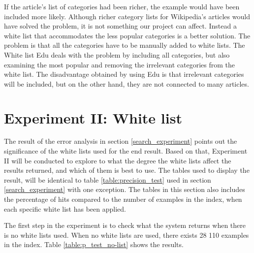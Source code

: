 If the article's list of categories had been richer, the example would have been included more likely. Although richer category lists for Wikipedia's articles would have solved the problem, it is not something our project can affect. Instead a white list that accommodates the less popular categories is a better solution. The problem is that all the categories have to be manually added to white lists. The White list Edu deals with the problem by including all categories, but also examining the most popular and removing the irrelevant categories from the white list. The disadvantage obtained by using Edu is that irrelevant categories will be included, but on the other hand, they are not connected to many articles. 

\section{Experiment II: White list}

The result of the error analysis in section \ref{search_experiment} points out the significance of the white lists used for the end result. Based on that, Experiment II will be conducted to explore to what the degree the white lists affect the results returned, and which of them is best to use. The tables used to display the result, will be identical to table \ref{table:precision_test} used in section \ref{search_experiment} with one exception. The tables in this section also includes the percentage of hits compared to the number of examples in the index, when each specific white list has been applied. 

The first step in the experiment is to check what the system returns when there is no white lists used. When no white lists are used, there exists 28 110 examples in the index. Table \ref{table:p_test_no-list} shows the results.

